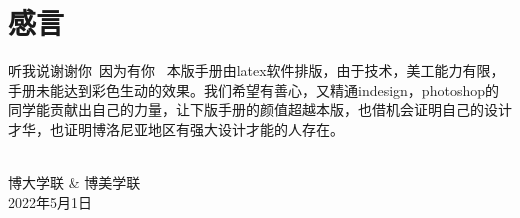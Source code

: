 
% 
%
%
%








\clearpage{\pagestyle{empty}\cleardoublepage}
\chapter*{感言}
\thispagestyle{empty}

听我说谢谢你~因为有你~
\noindent 本版手册由latex软件排版，由于技术，美工能力有限，手册未能达到彩色生动的效果。我们希望有善心，又精通indesign，photoshop的同学能贡献出自己的力量，让下版手册的颜值超越本版，也借机会证明自己的设计才华，也证明博洛尼亚地区有强大设计才能的人存在。\\\\
\begin{flushright}
博大学联 \& 博美学联 \\
2022年5月1日
\end{flushright}